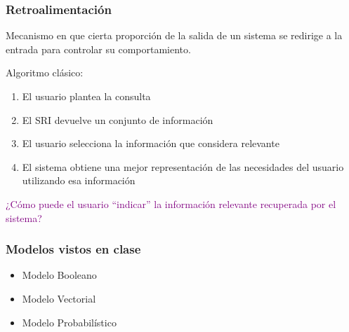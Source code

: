 \documentclass[
10pt, %
aspectratio=169, %
]{beamer}
\begin{document}
	\begin{frame}
		
		\frametitle{Retroalimentación}
		
		\begin{alertblock}{}
			Mecanismo en que cierta proporción de la salida de un sistema se redirige a la entrada para controlar su comportamiento.
		\end{alertblock} 

		\vspace{2\baselineskip}
		Algoritmo clásico: 
		
		\begin{enumerate}
			\item El usuario plantea la consulta
			\item El SRI devuelve un conjunto de información
			\item El usuario selecciona la información que considera relevante 
			\item El sistema obtiene una mejor representación de las necesidades del usuario utilizando esa información
		\end{enumerate}
		
		\pause
		\vspace{2\baselineskip}
		\textcolor{purple}{¿Cómo puede el usuario ``indicar'' la información relevante recuperada por el sistema?}		
		
	\end{frame}
	
	\begin{frame}
		
		\frametitle{Modelos vistos en clase}
		
		\begin{itemize}
			\item Modelo Booleano \\[2mm]
			\item Modelo Vectorial \\[2mm]
			\item Modelo Probabilístico 
		\end{itemize}
		
	\end{frame}
	
\end{document}

